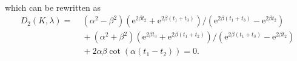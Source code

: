 \documentclass[a4paper,11pt]{article}
\begin{document}
\begin{appendices}
\begin{equation*}
\begin{split}
\end{split}
\end{equation*}
which can be rewritten as
\begin{equation*}
\begin{split}
D_2(K, \lambda) = &\; (\alpha^2 - \beta^2)(\mathrm{e}^{2 \beta t_2} + \mathrm{e}^{2 \beta (t_1+t_3)}) / (\mathrm{e}^{2 \beta (t_1+t_3)} - \mathrm{e}^{2 \beta t_2}) \\
&\; + (\alpha^2 + \beta^2)(\mathrm{e}^{2 \beta t_3} + \mathrm{e}^{2 \beta (t_1+t_2)}) / (\mathrm{e}^{2 \beta (t_1+t_3)} - \mathrm{e}^{2 \beta t_2}) \\
&\; + 2 \alpha \beta \cot(\alpha (t_1 - t_2)) = 0.
\end{split}
\end{equation*}

\end{appendices}

\setlength{\bibsep}{5pt}
\small

\end{document}
